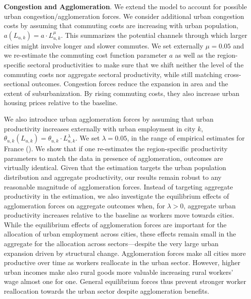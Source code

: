 \documentclass[./20250130-paper.tex]{subfiles}
\begin{document}
\textbf{Congestion and Agglomeration}. We extend the model to account for possible urban congestion/agglomeration forces. We consider additional urban congestion costs by assuming that commuting costs are increasing with urban population, $a(L_{u,k})= a\cdot L_{u,k}^{\mu}$. This summarizes the potential channels through which larger cities might involve longer and slower commutes. We set externally $\mu=0.05$ and we re-estimate the commuting cost function parameter $a$ as well as the region-specific sectoral productivities to make sure that we shift neither the level of the commuting costs nor aggregate sectoral productivity, while still matching cross-sectional outcomes. Congestion forces reduce the expansion in area and the extent of suburbanization. By rising commuting costs, they also increase urban housing prices relative to the baseline.


We also introduce urban agglomeration forces by assuming that urban productivity increases externally with urban employment in city $k$, $\theta_{u,k}(L_{u,k})= \theta_{u,k} \cdot L_{u,k}^{\lambda}$. We set $\lambda=0.05$, in the range of empirical estimates for France (\cite{combesetal2010}). We show that if one re-estimates the region-specific productivity parameters to match the data in presence of agglomeration, outcomes are virtually identical. Given that the estimation targets the urban population distribution and aggregate productivity, our results remain robust to any reasonable magnitude of agglomeration forces. Instead of targeting aggregate productivity in the estimation, we also investigate the equilibrium effects of agglomeration forces on aggregate outcomes when, for $\lambda>0$, aggregate urban productivity increases relative to the baseline as workers move towards cities. While the equilibrium effects of agglomeration forces are important for the allocation of urban employment across cities, these effects remain small in the aggregate for the allocation across sectors---despite the very large urban expansion driven by structural change. Agglomeration forces make all cities more productive over time as workers reallocate in the urban sector. However, higher urban incomes make also rural goods more valuable increasing rural workers' wage almost one for one. General equilibrium forces thus prevent stronger worker reallocation towards the urban sector despite agglomeration benefits.
\end{document}
